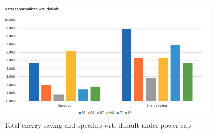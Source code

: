 \begin{figure} [h] %
	\centering   %
	\includegraphics[width=15cm]{pictures/cap}
	\caption{Total energy saving and speedup wrt. default under power cap}
\end{figure}





